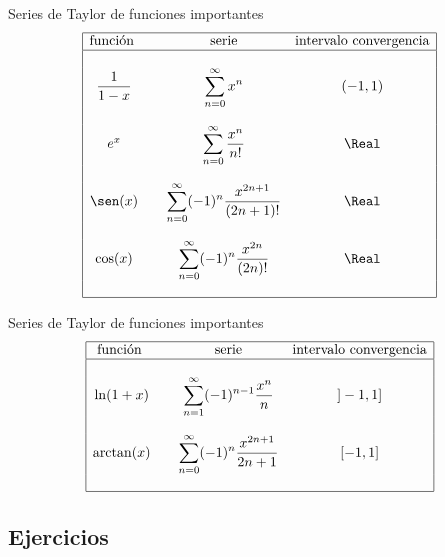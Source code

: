 \begin{frame}{Series de Taylor de funciones importantes}
  $$\begin{array}{|cccc|}
    \hline
    \text{función } & & \text{serie} & \text{intervalo convergencia}\\
    \hline
    & & & \\
    \dfrac{1}{1-x} & & \displaystyle\sum_{n=0}^\infty x^n & (-1,1)\\
    & & & \\
    e^x & & \displaystyle\sum_{n=0}^\infty \frac{x^n}{n!} & \Real\\
    & & & \\
    \sen(x) & & \displaystyle\sum_{n=0}^\infty (-1)^n\frac{x^{2n+1}}{(2n+1)!} & \Real\\
    & & & \\
    \cos(x) & & \displaystyle\sum_{n=0}^\infty (-1)^n\frac{x^{2n}}{(2n)!} & \Real\\
    & & & \\
    \hline
  \end{array}$$
\end{frame}

\begin{frame}{Series de Taylor de funciones importantes}
  $$\begin{array}{|cccc|}
    \hline
    \text{función } & & \text{serie} & \text{intervalo convergencia}\\
    \hline
    & & & \\
    \ln(1+x) & & \displaystyle\sum_{n=1}^\infty (-1)^{n-1}\frac{x^n}{n} & ]-1,1]\\
    & & & \\
    \arctan(x) & & \displaystyle\sum_{n=0}^\infty (-1)^n\frac{x^{2n+1}}{2n+1} & [-1,1]\\
    & & & \\
    \hline
  \end{array}$$
\end{frame}

\subsection{Ejercicios}
\begin{frame}
\subsectionpage
\end{frame}


